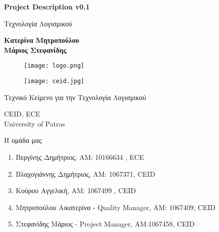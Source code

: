 \documentclass{article}
\begin{document}

\begin{titlepage}
   \begin{center}
       \vspace*{1cm}

       \textbf{\huge Project Description v0.1}

       \vspace{0.5cm}
        Τεχνολογία Λογισμικού
            
       \vspace{1cm}

       \textbf{Κατερίνα Μητροπούλου\\Μάριος Στεφανίδης}
       
       \begin{figure}[!htb]
        \centering
        \texttt{[image: logo.png]}
        \end{figure}
        
        \vspace{0.5cm}
        
        \begin{figure}[!htb]
        \centering
        \texttt{[image: ceid.jpg]}
        \end{figure}


       \vfill
            
       Τεχνικό Κείμενο για την Τεχνολογία Λογισμικού\\
            
       \vspace{0.5cm}
            
       CEID, ECE\\
       University of Patras\\
            
   \end{center}
\end{titlepage}



\noindent Η ομάδα μας

\begin{enumerate}
  \item Βεργίνης Δημήτριος, ΑΜ: 10166634 , ECE
  \item Βλαχογιάννης Δημήτριος, ΑΜ: 1067371, CEID
  \item Κούρου Αγγελική, ΑΜ: 1067499 , CEID
  \item Μητροπούλου Αικατερίνα - Quality Manager, ΑΜ: 1067409, CEID
  \item Στεφανίδης Μάριος - Project Manager, ΑΜ:1067458, CEID
\end{enumerate}
\end{document}
